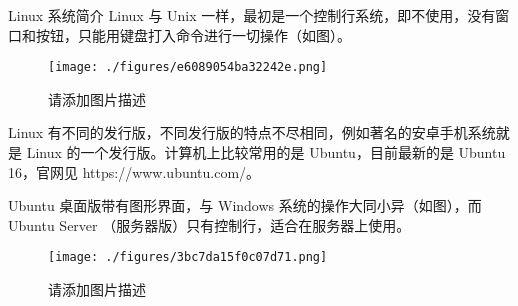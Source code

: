 
\begin{issues}
\issueDraft
\end{issues}

Linux 系统简介
Linux 与 Unix 一样，最初是一个控制行系统，即不使用，没有窗口和按钮，只能用键盘打入命令进行一切操作（如图）。

\begin{figure}[ht]
\centering
\texttt{[image: ./figures/e6089054ba32242e.png]}
\caption{请添加图片描述} \label{fig_Linux0_1}
\end{figure}

Linux 有不同的发行版，不同发行版的特点不尽相同，例如著名的安卓手机系统就是 Linux 的一个发行版。计算机上比较常用的是 Ubuntu，目前最新的是 Ubuntu 16，官网见 https://www.ubuntu.com/。

Ubuntu 桌面版带有图形界面，与 Windows 系统的操作大同小异（如图），而 Ubuntu Server （服务器版）只有控制行，适合在服务器上使用。

\begin{figure}[ht]
\centering
\texttt{[image: ./figures/3bc7da15f0c07d71.png]}
\caption{请添加图片描述} \label{fig_Linux0_2}
\end{figure}
